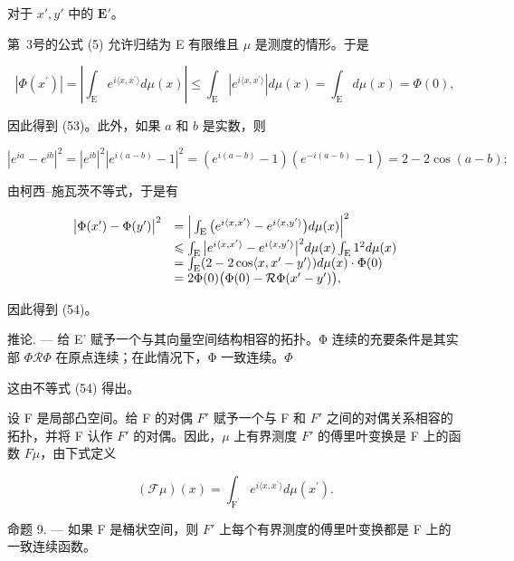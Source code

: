 对于 \(x', y'\) 中的 \(\mathbf{E}'\)。

第~3号的公式 (5) 允许归结为 E 有限维且 \(\mu\) 是测度的情形。于是

\[
\left| \Phi (x ^ {\prime}) \right| = \left| \int_ {\mathrm{E}} e ^ {i \langle x, x ^ {\prime} \rangle} d \mu (x) \right| \leqslant \int_ {\mathrm{E}} | e ^ {i \langle x, x ^ {\prime} \rangle} | d \mu (x) = \int_ {\mathrm{E}} d \mu (x) = \Phi (0),
\]

因此得到 (53)。此外，如果 \(a\) 和 \(b\) 是实数，则

\[
\left| e ^ {i a} - e ^ {i b} \right| ^ {2} = \left| e ^ {i b} \right| ^ {2} \left| e ^ {i (a - b)} - 1 \right| ^ {2} = \left(e ^ {i (a - b)} - 1\right) \left(e ^ {- i (a - b)} - 1\right) = 2 - 2 \cos (a - b);
\]

由柯西--施瓦茨不等式，于是有

\[
\begin{array}{r l} \big | \Phi (x ^ {\prime}) - \Phi (y ^ {\prime}) \big | ^ {2} & = \Big | \int_ {\mathrm{E}} \big (e ^ {i \langle x, x ^ {\prime} \rangle} - e ^ {i \langle x, y ^ {\prime} \rangle} \big) d \mu (x) \Big | ^ {2} \\ & \leqslant \int_ {\mathrm{E}} \big | e ^ {i \langle x, x ^ {\prime} \rangle} - e ^ {i \langle x, y ^ {\prime} \rangle} \big | ^ {2} d \mu (x) \int_ {\mathrm{E}} 1 ^ {2} d \mu (x) \\ & = \int_ {\mathrm{E}} (2 - 2 \cos \langle x, x ^ {\prime} - y ^ {\prime} \rangle) d \mu (x) \cdot \Phi (0) \\ & = 2 \Phi (0) \big (\Phi (0) - \mathcal {R} \Phi (x ^ {\prime} - y ^ {\prime}) \big), \end{array}
\]

因此得到 (54)。

推论. --- 给 E' 赋予一个与其向量空间结构相容的拓扑。Φ 连续的充要条件是其实部 \(\Phi\)\(\mathcal{R}\Phi\) 在原点连续；在此情况下，Φ 一致连续。\(\Phi\)

这由不等式 (54) 得出。

设 F 是局部凸空间。给 F 的对偶 \(F'\) 赋予一个与 F 和 \(F'\) 之间的对偶关系相容的拓扑，并将 F 认作 \(F'\) 的对偶。因此，\(\mu\) 上有界测度 \(F'\) 的傅里叶变换是 F 上的函数 \(F\mu\)，由下式定义

\[
(\mathcal {F} \mu) (x) = \int_ {\mathrm{F} ^ {\prime}} e ^ {i \langle x, x ^ {\prime} \rangle} d \mu (x ^ {\prime}).
\]

命题 9. --- 如果 F 是桶状空间，则 \(F'\) 上每个有界测度的傅里叶变换都是 F 上的一致连续函数。

